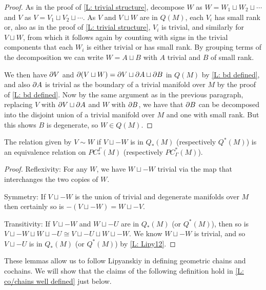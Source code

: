 \begin{proof}
	As in the proof of \cref{L: trivial structure}, decompose $W$ as $W = W_1 \sqcup W_2 \sqcup \cdots$ and $V$ as $V = V_1 \sqcup V_2 \sqcup \cdots$.
	As $V$ and $V \sqcup W$ are in $Q(M)$, each $V_i$ has small rank or, also as in the proof of \cref{L: trivial structure}, $V_i$ is trivial, and similarly for $V \sqcup W$, from which it follows again by counting with signs in the trivial components that each $W_i$ is either trivial or has small rank.
	By grouping terms of the decomposition we can write $W = A \sqcup B$ with $A$ trivial and $B$ of small rank.

	We then have $\partial V$ and $\partial (V \sqcup W) = \partial V \sqcup \partial A \sqcup \partial B$ in $Q(M)$ by \cref{L: bd defined}, and also $\partial A$ is trivial as the boundary of a trivial manifold over $M$ by the proof of \cref{L: bd defined}.
	Now by the same argument as in the previous paragraph, replacing $V$ with $\partial V \sqcup \partial A$ and $W$ with $\partial B$, we have that $\partial B$ can be decomposed into the disjoint union of a trivial manifold over $M$ and one with small rank.
	But this shows $B$ is degenerate, so $W \in Q(M)$.
\end{proof}

\begin{lemma}\label{L: cancel Q}
	The relation given by $V\sim W$ if $V \sqcup -W$ is in $Q_*(M)$ (respectively $Q^*(M)$) is an equivalence relation on $PC^\Gamma_*(M)$ (respectively $PC_\Gamma^*(M)$).
\end{lemma}

\begin{proof}
	Reflexivity: For any $W$, we have $W \sqcup -W$ trivial via the map that interchanges the two copies of $W$.

	Symmetry: If $V \sqcup -W$ is the union of trivial and degenerate manifolds over $M$ then certainly so is $-(V \sqcup -W) = W \sqcup -V$.

	Transitivity: If $V \sqcup -W$ and $W \sqcup -U$ are in $Q_*(M)$ (or $Q^*(M)$), then so is $V \sqcup -W \sqcup W \sqcup -U \cong V \sqcup -U \sqcup W \sqcup -W$.
	We know $W \sqcup -W$ is trivial, and so $V \sqcup -U$ is in $Q_*(M)$ (or $Q^*(M)$) by \cref{L: Lipy12}.
\end{proof}

These lemmas allow us to follow Lipyanskiy in defining geometric chains and cochains.
We will show that the claims of the following definition hold in \cref{L: co/chains well defined} just below.

